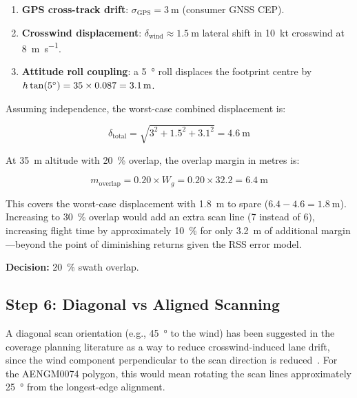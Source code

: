 \begin{enumerate}
  \item \textbf{GPS cross-track drift}: $\sigma_{\mathrm{GPS}} = \SI{3}{\metre}$ (consumer GNSS CEP).
  \item \textbf{Crosswind displacement}: $\delta_{\mathrm{wind}} \approx \SI{1.5}{\metre}$ lateral shift in \SI{10}{kt} crosswind at \SI{8}{\metre\per\second}.
  \item \textbf{Attitude roll coupling}: a \SI{5}{\degree} roll displaces the footprint centre by $h \tan(5\degree) = 35 \times 0.087 = \SI{3.1}{\metre}$.
\end{enumerate}

Assuming independence, the worst-case combined displacement is:

\begin{equation}\label{eq:lane-error}
  \delta_{\mathrm{total}} = \sqrt{3^2 + 1.5^2 + 3.1^2} = \SI{4.6}{\metre}
\end{equation}

At \SI{35}{\metre} altitude with \SI{20}{\percent} overlap, the overlap margin in metres is:

\begin{equation}
  m_{\mathrm{overlap}} = 0.20 \times W_g = 0.20 \times 32.2 = \SI{6.4}{\metre}
\end{equation}

This covers the worst-case displacement with \SI{1.8}{\metre} to spare ($6.4 - 4.6 = \SI{1.8}{\metre}$).
Increasing to \SI{30}{\percent} overlap would add an extra scan line (7 instead of 6), increasing flight time by approximately \SI{10}{\percent} for only \SI{3.2}{\metre} of additional margin---beyond the point of diminishing returns given the RSS error model.

\textbf{Decision:} \SI{20}{\percent} swath overlap.

\subsection{Step 6: Diagonal vs Aligned Scanning}\label{sec:step-diagonal}

A diagonal scan orientation (e.g., \SI{45}{\degree} to the wind) has been suggested in the coverage planning literature as a way to reduce crosswind-induced lane drift, since the wind component perpendicular to the scan direction is reduced~\cite{galceran2013survey}.
For the AENGM0074 polygon, this would mean rotating the scan lines approximately \SI{25}{\degree} from the longest-edge alignment.

